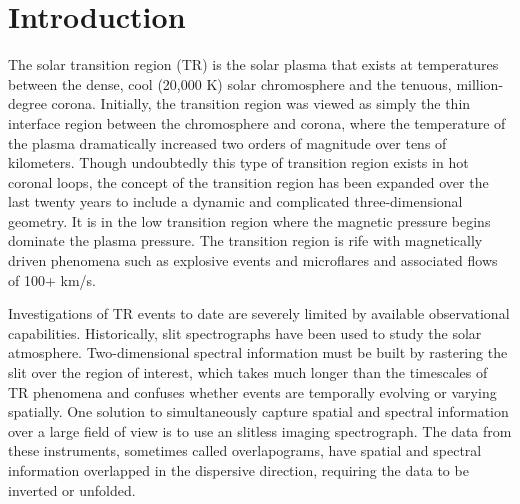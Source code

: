 \section{Introduction}

    The solar transition region (TR) is the solar plasma that exists at temperatures between the
    dense, cool (20,000 K) solar chromosphere and the tenuous, million-degree corona. 
    Initially, the transition region was viewed as simply the thin interface region between the chromosphere and corona, where the temperature of the plasma dramatically increased two orders of magnitude over tens of kilometers. 
    Though undoubtedly this type of transition region exists in hot coronal loops, the concept of the transition region has been expanded over the last twenty years to include a dynamic and complicated three-dimensional geometry. 
    It is in the low transition region where the magnetic pressure begins dominate the plasma pressure. The transition region is rife with magnetically driven phenomena such as explosive events \cite[e.g.,][]{dere1991} and microflares \citep{gontikakis2012} and associated flows of 100+ km/s.  
    
    Investigations of TR events to date are severely limited by available observational capabilities. 
    Historically, slit spectrographs have been used to study the solar atmosphere.   
    Two-dimensional spectral information must be built by rastering the slit over the region of interest, which takes much longer than the timescales of TR phenomena and confuses whether events are temporally evolving or varying spatially.  
    One solution to simultaneously capture spatial and spectral information over a large field of view is to use an slitless imaging spectrograph.  
    The data from these instruments, sometimes called overlapograms, have spatial and spectral information overlapped in the dispersive direction, requiring the data to be inverted or unfolded.  
    
